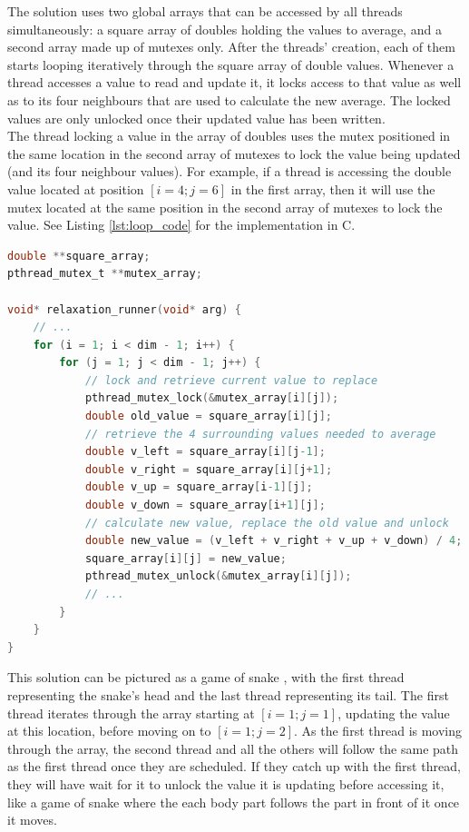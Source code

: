 \documentclass[letterpaper,12pt]{article}
\begin{document}
The solution uses two global arrays that can be accessed by all threads simultaneously: a square array of doubles holding the values to average, and a second array made up of mutexes only. After the threads' creation, each of them starts looping iteratively through the square array of double values. Whenever a thread accesses a value to read and update it, it locks access to that value as well as to its four neighbours that are used to calculate the new average. The locked values are only unlocked once their updated value has been written.\\

The thread locking a value in the array of doubles uses the mutex positioned in the same location in the second array of mutexes to lock the value being updated (and its four neighbour values). For example, if a thread is accessing the double value located at position $[i=4; j=6]$ in the first array, then it will use the mutex located at the same position in the second array of mutexes to lock the value. See Listing \ref{lst:loop_code} for the implementation in C.\\

\begin{lstlisting}[language=C, caption=Looping through the arrays (main.c), label={lst:loop_code}]
double **square_array;
pthread_mutex_t **mutex_array;

void* relaxation_runner(void* arg) {
    // ...
    for (i = 1; i < dim - 1; i++) {
    	for (j = 1; j < dim - 1; j++) {
    		// lock and retrieve current value to replace
    		pthread_mutex_lock(&mutex_array[i][j]);
    		double old_value = square_array[i][j];
    		// retrieve the 4 surrounding values needed to average
    		double v_left = square_array[i][j-1];
    		double v_right = square_array[i][j+1];
    		double v_up = square_array[i-1][j];
    		double v_down = square_array[i+1][j];
    		// calculate new value, replace the old value and unlock
    		double new_value = (v_left + v_right + v_up + v_down) / 4;
    		square_array[i][j] = new_value;
    		pthread_mutex_unlock(&mutex_array[i][j]);
    		// ...
    	}
    }
}
\end{lstlisting}

This solution can be pictured as a game of snake \cite{snake_game}, with the first thread representing the snake's head and the last thread representing its tail. The first thread iterates through the array starting at $[i=1; j=1]$, updating the value at this location, before moving on to $[i=1; j=2]$. As the first thread is moving through the array, the second thread and all the others will follow the same path as the first thread once they are scheduled. If they catch up with the first thread, they will have wait for it to unlock the value it is updating before accessing it, like a game of snake where the each body part follows the part in front of it once it moves.\\
\end{document}
